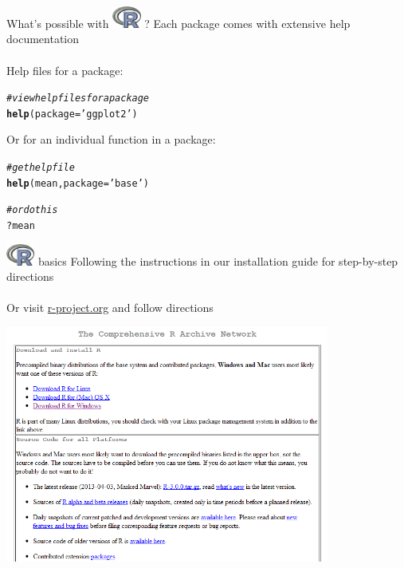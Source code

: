 \documentclass[xcolor=svgnames]{beamer}\usepackage[]{graphicx}\usepackage[]{color}
\makeatletter
\newcommand{\hlstr}[1]{\textcolor[rgb]{0.192,0.494,0.8}{#1}}%
\newcommand{\hlcom}[1]{\textcolor[rgb]{0.678,0.584,0.686}{\textit{#1}}}%
\newcommand{\hlopt}[1]{\textcolor[rgb]{0,0,0}{#1}}%
\newcommand{\hlstd}[1]{\textcolor[rgb]{0.345,0.345,0.345}{#1}}%
\newcommand{\hlkwc}[1]{\textcolor[rgb]{0.333,0.667,0.333}{#1}}%
\newcommand{\hlkwd}[1]{\textcolor[rgb]{0.737,0.353,0.396}{\textbf{#1}}}%
\newenvironment{kframe}{%
 \def\at@end@of@kframe{}%
 \ifinner\ifhmode%
  \def\at@end@of@kframe{\end{minipage}}%
  \begin{minipage}{\columnwidth}%
 \fi\fi%
 \def\FrameCommand##1{\hskip\@totalleftmargin \hskip-\fboxsep
 \colorbox{shadecolor}{##1}\hskip-\fboxsep
     \hskip-\linewidth \hskip-\@totalleftmargin \hskip\columnwidth}%
 \MakeFramed {\advance\hsize-\width
   \@totalleftmargin\z@ \linewidth\hsize
   \@setminipage}}%
 {\par\unskip\endMakeFramed%
 \at@end@of@kframe}
\newenvironment{knitrout}{}{} %
\makeatother
\begin{document}
\begin{frame}[t,fragile]{What's possible with \includegraphics[width=0.07\textwidth]{Rlogo.jpg} \hspace{0.2em}? }
Each package comes with extensive help documentation\\~\\
Help files for a package:
\begin{knitrout}\scriptsize
{}\color{fgcolor}\begin{kframe}
\begin{alltt}
\hlcom{# view help files for a package}
\hlkwd{help}\hlstd{(}\hlkwc{package} \hlstd{=} \hlstr{'ggplot2'}\hlstd{)}
\end{alltt}
\end{kframe}
\end{knitrout}
Or for an individual function in a package:
\begin{knitrout}\scriptsize
{}\color{fgcolor}\begin{kframe}
\begin{alltt}
\hlcom{# get help file}
\hlkwd{help}\hlstd{(mean,} \hlkwc{package} \hlstd{=} \hlstr{'base'}\hlstd{)}

\hlcom{# or do this}
\hlopt{?}\hlstd{mean}
\end{alltt}
\end{kframe}
\end{knitrout}
\end{frame}

\begin{frame}[t]{\includegraphics[width=0.07\textwidth]{Rlogo.jpg} \hspace{0.01in} basics}
Following the instructions in our installation guide for step-by-step directions \\~\\
Or visit \href{http://cran.us.r-project.org/}{r-project.org} and follow directions
\centerline{\includegraphics[width = 0.8\textwidth]{download.png}}
\end{frame}
\end{document}
